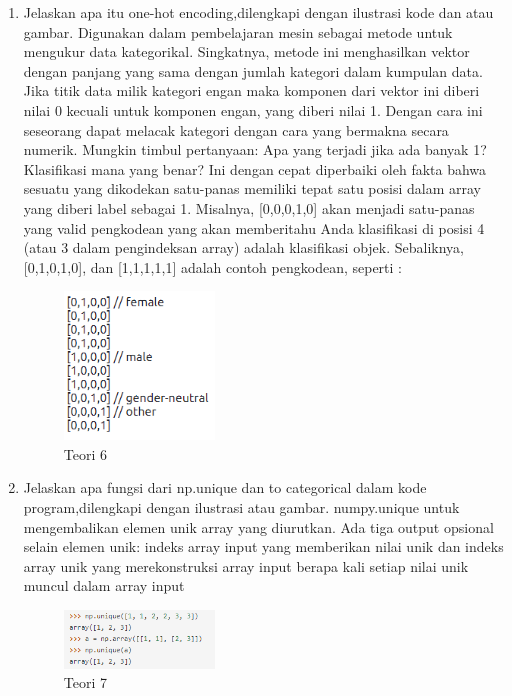\begin{enumerate}
	\item Jelaskan apa itu one-hot encoding,dilengkapi dengan ilustrasi kode dan atau gambar.
	\hfill\break
	Digunakan dalam pembelajaran mesin sebagai metode untuk mengukur data kategorikal. Singkatnya, metode ini menghasilkan vektor dengan panjang yang sama dengan jumlah kategori dalam kumpulan data. Jika titik data milik kategori engan maka komponen dari vektor ini diberi nilai 0 kecuali untuk komponen engan, yang diberi nilai 1. Dengan cara ini seseorang dapat melacak kategori dengan cara yang bermakna secara numerik. Mungkin timbul pertanyaan: Apa yang terjadi jika ada banyak 1? Klasifikasi mana yang benar? Ini dengan cepat diperbaiki oleh fakta bahwa sesuatu yang dikodekan satu-panas memiliki tepat satu posisi dalam array yang diberi label sebagai 1. Misalnya, [0,0,0,1,0] akan menjadi satu-panas yang valid pengkodean yang akan memberitahu Anda klasifikasi di posisi 4 (atau 3 dalam pengindeksan array) adalah klasifikasi objek. Sebaliknya, [0,1,0,1,0], dan [1,1,1,1,1] adalah contoh pengkodean, seperti :

	\begin{figure}[H]
	\centering
		\includegraphics[width=4cm]{figures/1174080/6/materi/teori6_1.PNG}
		\caption{Teori 6}
	\end{figure}

	\item Jelaskan apa fungsi dari np.unique dan to categorical dalam kode program,dilengkapi dengan ilustrasi atau gambar.
	\hfill\break
	numpy.unique untuk mengembalikan elemen unik array yang diurutkan. Ada tiga output opsional selain elemen unik: indeks array input yang memberikan nilai unik dan indeks array unik yang merekonstruksi array input berapa kali setiap nilai unik muncul dalam array input

	\begin{figure}[H]
	\centering
		\includegraphics[width=4cm]{figures/1174080/6/materi/teori7_1.PNG}
		\caption{Teori 7}
	\end{figure}


\end{enumerate}
